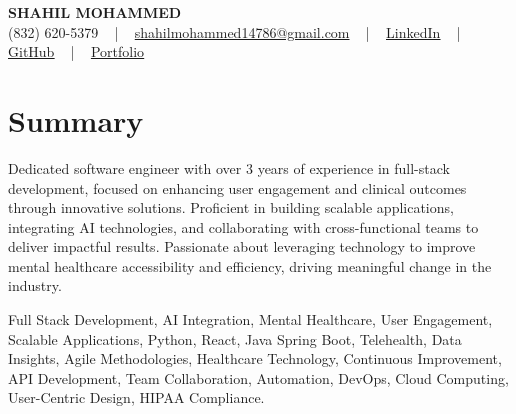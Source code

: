 \documentclass[letterpaper,10pt]{article}
\begin{document}
\begin{center}
    {\fontsize{14pt}{12pt}\selectfont \textbf{\MakeUppercase{Shahil Mohammed}}}\\ \vspace{2pt}
    \fontsize{10pt}{12pt}\selectfont (832) 620-5379 ~ | ~ \href{mailto:shahilmohammed14786@gmail.com}{shahilmohammed14786@gmail.com} ~ | ~  
    \href{https://www.linkedin.com/in/shahil-mohammed-9652931a1/}{\color{blue}\underline{LinkedIn}}  ~ | ~ 
    \href{https://github.com/freakbeast14}{\color{blue}\underline{GitHub}} ~ | ~ 
    \href{https://shahil-mohammed.netlify.app/}{\color{blue}\underline{Portfolio}}
    \vspace{-8pt}
\end{center}

\section{Summary}
\vspace{-2pt}\fontsize{8pt}{9pt}\selectfont
Dedicated software engineer with over 3 years of experience in full-stack development, focused on enhancing user engagement and clinical outcomes through innovative solutions. Proficient in building scalable applications, integrating AI technologies, and collaborating with cross-functional teams to deliver impactful results. Passionate about leveraging technology to improve mental healthcare accessibility and efficiency, driving meaningful change in the industry.
 \vspace{-5pt}
 
{\fontsize{1pt}{1pt}\selectfont\color{white}
Full Stack Development, AI Integration, Mental Healthcare, User Engagement, Scalable Applications, Python, React, Java Spring Boot, Telehealth, Data Insights, Agile Methodologies, Healthcare Technology, Continuous Improvement, API Development, Team Collaboration, Automation, DevOps, Cloud Computing, User-Centric Design, HIPAA Compliance.
}
\vspace{-8pt}

\vspace{-2pt}
\end{document}
